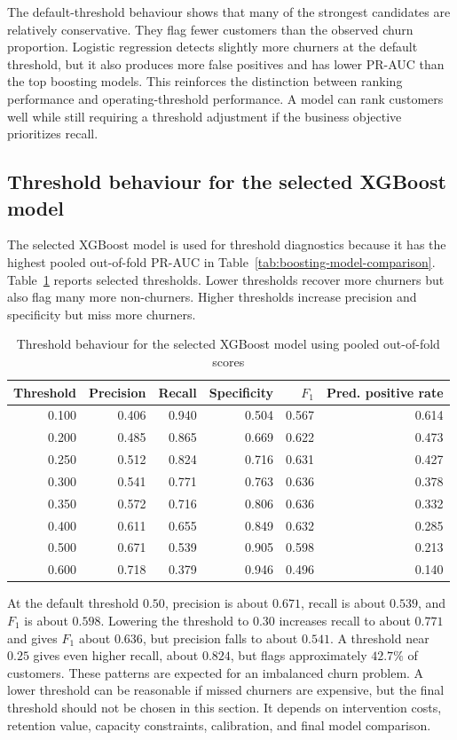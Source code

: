 The default-threshold behaviour shows that many of the strongest candidates are relatively conservative. They flag fewer customers than the observed churn proportion. Logistic regression detects slightly more churners at the default threshold, but it also produces more false positives and has lower PR-AUC than the top boosting models. This reinforces the distinction between ranking performance and operating-threshold performance. A model can rank customers well while still requiring a threshold adjustment if the business objective prioritizes recall.

\subsection{Threshold behaviour for the selected XGBoost model}

The selected XGBoost model is used for threshold diagnostics because it has the highest pooled out-of-fold PR-AUC in Table~\ref{tab:boosting-model-comparison}. Table~\ref{tab:boosting-threshold-results} reports selected thresholds. Lower thresholds recover more churners but also flag many more non-churners. Higher thresholds increase precision and specificity but miss more churners.

\begin{table}[H]
\centering
\small
\begin{tabular}{rrrrrr}
\toprule
Threshold & Precision & Recall & Specificity & \(F_1\) & Pred. positive rate \\
\midrule
0.100 & 0.406 & 0.940 & 0.504 & 0.567 & 0.614 \\
0.200 & 0.485 & 0.865 & 0.669 & 0.622 & 0.473 \\
0.250 & 0.512 & 0.824 & 0.716 & 0.631 & 0.427 \\
0.300 & 0.541 & 0.771 & 0.763 & 0.636 & 0.378 \\
0.350 & 0.572 & 0.716 & 0.806 & 0.636 & 0.332 \\
0.400 & 0.611 & 0.655 & 0.849 & 0.632 & 0.285 \\
0.500 & 0.671 & 0.539 & 0.905 & 0.598 & 0.213 \\
0.600 & 0.718 & 0.379 & 0.946 & 0.496 & 0.140 \\
\bottomrule
\end{tabular}
\caption{Threshold behaviour for the selected XGBoost model using pooled out-of-fold scores}
\label{tab:boosting-threshold-results}
\end{table}

At the default threshold \(0.50\), precision is about \(0.671\), recall is about \(0.539\), and \(F_1\) is about \(0.598\). Lowering the threshold to \(0.30\) increases recall to about \(0.771\) and gives \(F_1\) about \(0.636\), but precision falls to about \(0.541\). A threshold near \(0.25\) gives even higher recall, about \(0.824\), but flags approximately \(42.7\%\) of customers. These patterns are expected for an imbalanced churn problem. A lower threshold can be reasonable if missed churners are expensive, but the final threshold should not be chosen in this section. It depends on intervention costs, retention value, capacity constraints, calibration, and final model comparison.


